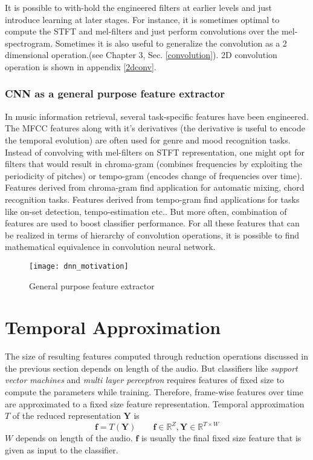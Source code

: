 \FloatBarrier
\noindent It is possible to with-hold the engineered filters at earlier levels and just introduce learning at later stages. For instance, it is sometimes optimal to compute the STFT and mel-filters and just perform convolutions over the mel-spectrogram\cite{EndToEnd}\cite{choi_cnn}. Sometimes it is also useful to generalize the convolution as a 2 dimensional operation\cite{MusicMotive}.(see Chapter 3, Sec. \ref{convolution}). 2D convolution operation is shown in appendix \ref{2dconv}. 

\subsubsection{CNN as a general purpose feature extractor}  
\label{general}
In music information retrieval, several task-specific features have been engineered. The MFCC features along with it's derivatives (the derivative is useful to encode the temporal evolution) are often used for genre and mood recognition tasks. Instead of convolving with mel-filters on STFT representation, one might opt for filters that would result in chroma-gram (combines frequencies by exploiting the periodicity of pitches) or tempo-gram (encodes change of frequencies over time). Features derived from chroma-gram find application for automatic mixing, chord recognition tasks. Features derived from tempo-gram find applications for tasks like on-set detection, tempo-estimation etc.. But more often, combination of features are used to boost classifier performance. For all these features that can be realized in terms of hierarchy of convolution operations, it is possible to find mathematical equivalence in convolution neural network.     

\begin{figure}[h] 
\centering
\texttt{[image: dnn\_motivation]}
\caption{General purpose feature extractor}
 \label{fig:deep learning}
 \end{figure}
\FloatBarrier
\bigskip

\section{Temporal Approximation}
\label{temporal}
The size of resulting features computed through reduction operations discussed in the previous section depends on length of the audio. But classifiers like \textit{support vector machines} and \textit{multi layer perceptron} requires features of fixed size to compute the parameters while training. Therefore, frame-wise features over time are approximated to a fixed size feature representation. Temporal approximation $T$ of the reduced representation $\textbf{Y}$ is  
\[
\textbf{f} = T(\textbf{Y}) \qquad \textbf{f} \in \mathbb{R}^{Z}, \textbf{Y} \in \mathbb{R}^{T \times W}
\]
$W$ depends on length of the audio. $\textbf{f}$ is usually the final fixed size feature that is given as input to the classifier.  
\bigskip

